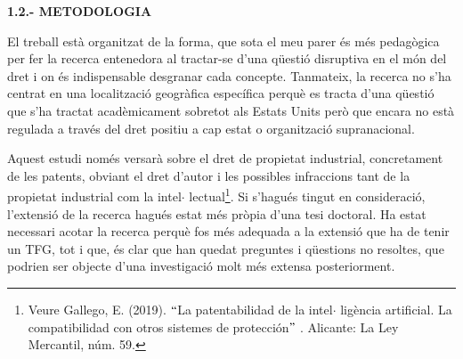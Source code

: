 \documentclass[12pt]{article}
\begin{document}
\vspace{\baselineskip}
\textbf{1.2.- METODOLOGIA}\par


\vspace{\baselineskip}
\begin{justify}
El treball està organitzat de la forma, que sota el meu parer és més pedagògica per fer la recerca entenedora al tractar-se d’una qüestió disruptiva en el món del dret i on és indispensable desgranar cada concepte. Tanmateix, la recerca no s’ha centrat en una localització geogràfica específica perquè es tracta d’una qüestió que s’ha tractat acadèmicament sobretot als Estats Units però que encara no està regulada a través del dret positiu a cap estat o organització supranacional. 
\end{justify}\par


\vspace{\baselineskip}
\begin{justify}
Aquest estudi només versarà sobre el dret de propietat industrial, concretament de les patents, obviant el dret d’autor i les possibles infraccions tant de la propietat industrial com la intel$ \cdot $ lectual\footnote{ Veure Gallego, E. (2019). $``$La patentabilidad de la intel$ \cdot $ ligència artificial. La compatibilidad con otros sistemes de protección$"$ . Alicante: La Ley Mercantil, núm. 59. }. Si s’hagués tingut en consideració, l’extensió de la recerca hagués estat més pròpia d’una tesi doctoral. Ha estat necessari acotar la recerca perquè fos més adequada a la extensió que ha de tenir un TFG, tot i que, és clar que han quedat preguntes i qüestions no resoltes, que podrien ser objecte d’una investigació molt més extensa posteriorment.
\end{justify}\par
\end{document}
